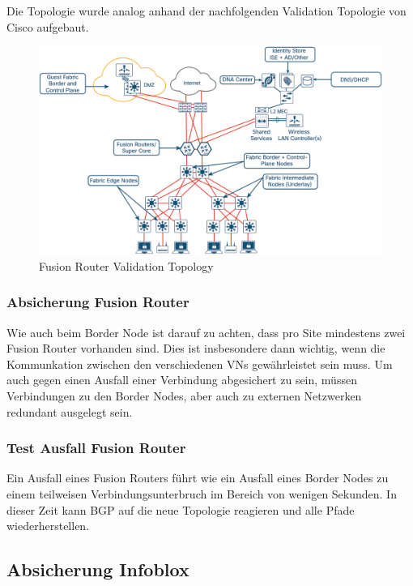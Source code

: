 Die Topologie wurde analog anhand der nachfolgenden Validation Topologie von Cisco aufgebaut.
\begin{figure}[H]
	\centering
	\includegraphics[width=1\linewidth]{img/Absicherung/FusionRouter-ValidationTopology}
	\caption{Fusion Router Validation Topology \cite{sda-deploymentguide-oct2018} }
	\label{fig:Fusion Router Validation Topology}
\end{figure}

\subsubsection{Absicherung Fusion Router}
Wie auch beim Border Node ist darauf zu achten, dass pro Site mindestens zwei Fusion Router vorhanden sind. Dies ist insbesondere dann wichtig, wenn die Kommunkation zwischen den verschiedenen VNs gewährleistet sein muss. Um auch gegen einen Ausfall einer Verbindung abgesichert zu sein, müssen Verbindungen zu den Border Nodes, aber auch zu externen Netzwerken redundant ausgelegt sein.

\subsubsection{Test Ausfall Fusion Router}

Ein Ausfall eines Fusion Routers führt wie ein Ausfall eines Border Nodes zu einem teilweisen Verbindungsunterbruch im Bereich von wenigen Sekunden. In dieser Zeit kann BGP auf die neue Topologie reagieren und alle Pfade wiederherstellen.

\subsection{Absicherung Infoblox}

